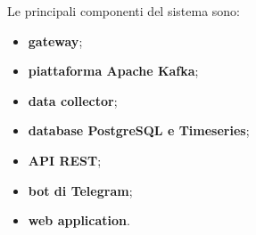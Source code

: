 		Le principali componenti del sistema sono:
		\begin{itemize}
		  	\item \textbf{gateway};
		  	\item \textbf{piattaforma Apache Kafka};
		  	\item \textbf{data collector};
		  	\item \textbf{database PostgreSQL e Timeseries};
		  	\item \textbf{API REST};
		  	\item \textbf{bot di Telegram};
		  	\item \textbf{web application}.    
		\end{itemize} 



			









